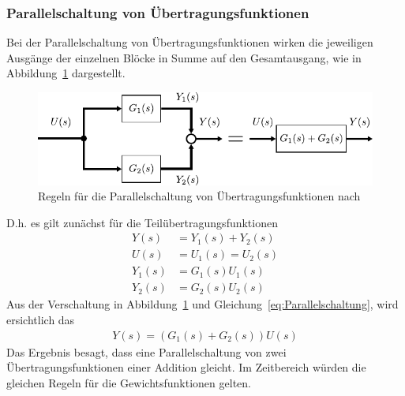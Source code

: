 \subsubsection{Parallelschaltung von Übertragungsfunktionen}
%
Bei der Parallelschaltung von Übertragungsfunktionen wirken die jeweiligen Ausgänge der einzelnen Blöcke in Summe auf den Gesamtausgang, wie in Abbildung~\ref{fig:Parallelschaltung} dargestellt. 
%
\begin{figure}[ht!]
	\centering
	\includegraphics[width=0.85\linewidth]{Abbildungen/Modellbildung/PDF/RechenregelnAddittion.pdf}
	\caption{Regeln für die Parallelschaltung von Übertragungsfunktionen nach \cite{Lunze10}}
	\label{fig:Parallelschaltung}
\end{figure}
%
D.h. es gilt zunächst für die Teilübertragungsfunktionen
%
\begin{equation}
\begin{aligned}
%
Y(s)&=Y_{1}(s)+Y_{2}(s)\\
U(s)&=U_{1}(s)=U_{2}(s)\\
Y_{1}(s)&=G_{1}(s)U_{1}(s)\\
Y_{2}(s)&=G_{2}(s)U_{2}(s)\label{eq:Parallelschaltung}
%
\end{aligned}
\end{equation} 
%
Aus der Verschaltung in Abbildung~\ref{fig:Parallelschaltung} und Gleichung~\ref{eq:Parallelschaltung}, wird ersichtlich das
%
\begin{equation*}
\begin{aligned}
%
Y(s)=\left(G_{1}(s)+G_{2}(s)\right)U(s)
%
\end{aligned}
\end{equation*} 
%
Das Ergebnis besagt, dass eine Parallelschaltung von zwei Übertragungsfunktionen einer Addition gleicht. Im Zeitbereich würden die gleichen Regeln für die Gewichtsfunktionen gelten.
%
